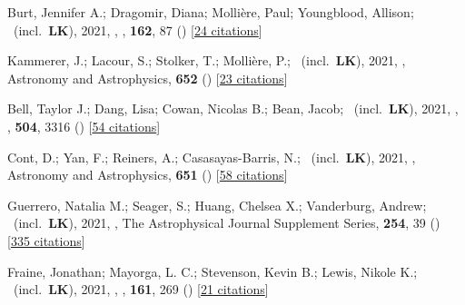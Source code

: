 \item[{\color{numcolor}\scriptsize57}] Burt, Jennifer A.; Dragomir, Diana; Molli{\`e}re, Paul; Youngblood, Allison; \etal\ (incl.\ \textbf{LK}), 2021, , \aj, \textbf{162}, 87 () [\href{https://ui.adsabs.harvard.edu/abs/2021AJ....162...87B}{24 citations}]

\item[{\color{numcolor}\scriptsize56}] Kammerer, J.; Lacour, S.; Stolker, T.; Molli{\`e}re, P.; \etal\ (incl.\ \textbf{LK}), 2021, , Astronomy and Astrophysics, \textbf{652} () [\href{https://ui.adsabs.harvard.edu/abs/2021A&A...652A..57K}{23 citations}]

\item[{\color{numcolor}\scriptsize55}] Bell, Taylor J.; Dang, Lisa; Cowan, Nicolas B.; Bean, Jacob; \etal\ (incl.\ \textbf{LK}), 2021, , \mnras, \textbf{504}, 3316 () [\href{https://ui.adsabs.harvard.edu/abs/2021MNRAS.504.3316B}{54 citations}]

\item[{\color{numcolor}\scriptsize54}] Cont, D.; Yan, F.; Reiners, A.; Casasayas-Barris, N.; \etal\ (incl.\ \textbf{LK}), 2021, , Astronomy and Astrophysics, \textbf{651} () [\href{https://ui.adsabs.harvard.edu/abs/2021A&A...651A..33C}{58 citations}]

\item[{\color{numcolor}\scriptsize53}] Guerrero, Natalia M.; Seager, S.; Huang, Chelsea X.; Vanderburg, Andrew; \etal\ (incl.\ \textbf{LK}), 2021, , The Astrophysical Journal Supplement Series, \textbf{254}, 39 () [\href{https://ui.adsabs.harvard.edu/abs/2021ApJS..254...39G}{335 citations}]

\item[{\color{numcolor}\scriptsize52}] Fraine, Jonathan; Mayorga, L. C.; Stevenson, Kevin B.; Lewis, Nikole K.; \etal\ (incl.\ \textbf{LK}), 2021, , \aj, \textbf{161}, 269 () [\href{https://ui.adsabs.harvard.edu/abs/2021AJ....161..269F}{21 citations}]


